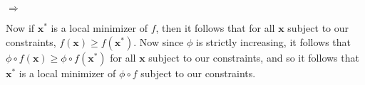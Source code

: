 \documentclass{article}
\begin{document}
	
	$\Rightarrow$
	
	Now if $\mathbf{x}^*$ is a local minimizer of $f$, then it follows that for all $\mathbf{x}$ subject to our constraints, $f(\mathbf{x}) \geq f(\mathbf{x}^*)$. Now since $\phi$ is strictly increasing, it follows that $\phi \circ f(\mathbf{x}) \geq \phi \circ f(\mathbf{x}^*)$ for all $\mathbf{x}$ subject to our constraints, and so it follows that $\mathbf{x}^*$ is a local minimizer of $\phi \circ f$ subject to our constraints.
	
\end{document}

